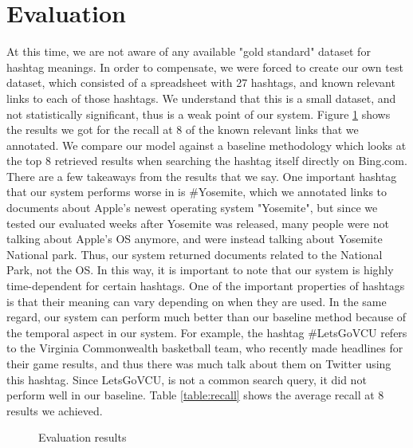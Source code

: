 \section{Evaluation}
 At this time, we are not aware of any available "gold standard" dataset for hashtag meanings.  In order to compensate, we were forced to create our own test dataset, which consisted of a spreadsheet with 27 hashtags, and known relevant links to each of those hashtags. We understand that this is a small dataset, and not statistically significant, thus is a weak point of our system. Figure \ref{fig:recallat8} shows the results we got for the recall at 8 of the known relevant links that we annotated. We compare our model against a baseline methodology which looks at the top 8 retrieved results when searching the hashtag itself directly on Bing.com. 
\\There are a few takeaways from the results that we say. One important hashtag that our system performs worse in is \#Yosemite, which we annotated links to documents about Apple's newest operating system "Yosemite", but since we tested our evaluated weeks after Yosemite was released, many people were not talking about Apple's OS anymore, and were instead talking about Yosemite National park. Thus, our system returned documents related to the National Park, not the OS. In this way, it is important to note that our system is highly time-dependent for certain hashtags. One of the important properties of hashtags is that their meaning can vary depending on when they are used. In the same regard, our system can perform much better than our baseline method because of the temporal aspect in our system. For example, the hashtag \#LetsGoVCU refers to the Virginia Commonwealth basketball team, who recently made headlines for their game results, and thus there was much talk about them on Twitter using this hashtag. Since LetsGoVCU, is not a common search query, it did not perform well in our baseline. Table \ref{table:recall} shows the average recall at 8 results we achieved.
 
 \begin{figure}[h!]
   \caption{Evaluation results} \label{fig:recallat8}
\end{figure}



